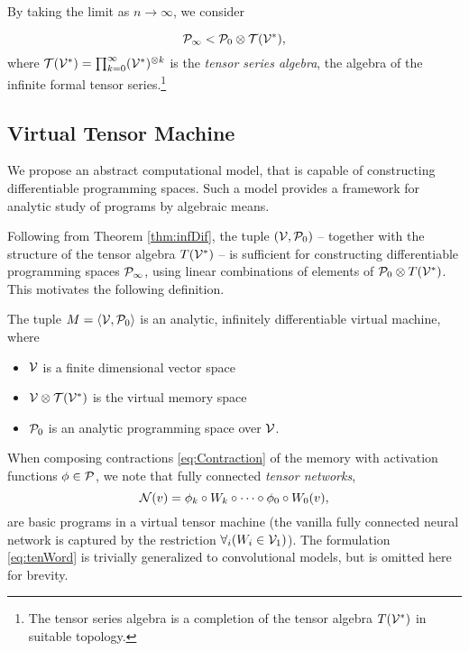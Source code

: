 By taking the limit as $n\to \infty$, we consider 
  
  \begin{equation}
  \label{eq:P_algebra}
        \mathcal{P}_\infty < \mathcal{P}_0\otimes \mathcal{T}(\mathcal{V}^*),
  \end{equation}
where $\mathcal{T}(\mathcal{V}^*)=\prod_{k=0}^\infty (\mathcal{V}^*)^{\otimes k}$ is the \emph{tensor series
  algebra}, the algebra of the infinite formal tensor series.\footnote{The
  tensor series algebra is a completion of the tensor algebra $T(\mathcal{V}^*)$ in suitable topology.}

\subsection{Virtual Tensor Machine}

We propose an abstract computational model, that is capable of constructing differentiable programming spaces. Such a model provides a
framework for analytic study of programs by algebraic means. 

Following from Theorem \ref{thm:infDif}, the tuple $(\mathcal{V}, \mathcal{P}_0)$ -- together with the structure of the tensor algebra $T(\mathcal{V}^*)$ -- is sufficient for constructing differentiable programming spaces $\mathcal{P}_\infty$, using linear combinations of elements of $\mathcal{P}_0\otimes T(\mathcal{V}^*)$. This motivates the following definition.

\begin{definition}\label{def:analyticMachine}
The tuple $M=\langle \mathcal{V},\mathcal{P}_0\rangle$ is an analytic, infinitely  differentiable virtual machine, where
   
    \begin{itemize}
    \item
    $\mathcal{V}$ is a finite dimensional vector space
    \item
    $\mathcal{V}\otimes \mathcal{T}(\mathcal{V}^*)$ is the virtual memory space
    \item
    $\mathcal{P}_0$ is an analytic programming space over $\mathcal{V}$.
    \end{itemize}
  \end{definition}

\noindent When composing contractions \eqref{eq:Contraction} of the memory with activation functions $\phi\in\mathcal{P}$, we note that fully connected \emph{tensor networks},
\begin{equation} \label{eq:tenWord}
\mathcal{N}(v)=\phi_k\circ W_k\circ\cdots\circ\phi_0\circ W_0(v),
\end{equation}
are basic programs in a virtual tensor machine (the vanilla fully connected neural network is  captured by the restriction $\forall_i(W_i\in\mathcal{V}_1)$). The formulation \eqref{eq:tenWord} is trivially generalized to convolutional models, but is omitted here for brevity.




\printbibliography

